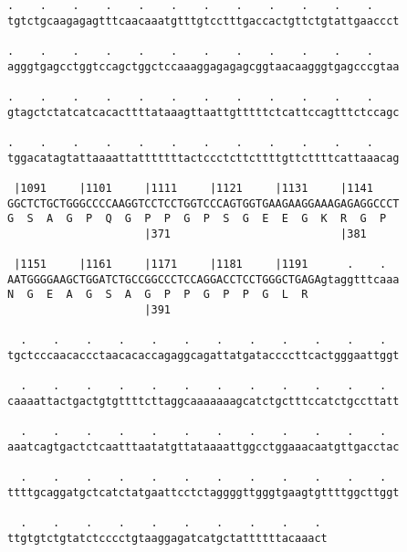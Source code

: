 \documentclass{article}
\begin{document}
\begin{Verbatim}
.    .    .    .    .    .    .    .    .    .    .    .    
tgtctgcaagagagtttcaacaaatgtttgtcctttgaccactgttctgtattgaaccct
                                                            
.    .    .    .    .    .    .    .    .    .    .    .    
agggtgagcctggtccagctggctccaaaggagagagcggtaacaagggtgagcccgtaa
                                                            
.    .    .    .    .    .    .    .    .    .    .    .    
gtagctctatcatcacacttttataaagttaattgtttttctcattccagtttctccagc
                                                            
.    .    .    .    .    .    .    .    .    .    .    .    
tggacatagtattaaaattatttttttactccctcttcttttgttcttttcattaaacag
                                                            
 |1091     |1101     |1111     |1121     |1131     |1141    
GGCTCTGCTGGGCCCCAAGGTCCTCCTGGTCCCAGTGGTGAAGAAGGAAAGAGAGGCCCT
G  S  A  G  P  Q  G  P  P  G  P  S  G  E  E  G  K  R  G  P  
                     |371                          |381     
  
 |1151     |1161     |1171     |1181     |1191      .    .  
AATGGGGAAGCTGGATCTGCCGGCCCTCCAGGACCTCCTGGGCTGAGAgtaggtttcaaa
N  G  E  A  G  S  A  G  P  P  G  P  P  G  L  R              
                     |391                                   
  
  .    .    .    .    .    .    .    .    .    .    .    .  
tgctcccaacaccctaacacaccagaggcagattatgataccccttcactgggaattggt
                                                            
  .    .    .    .    .    .    .    .    .    .    .    .  
caaaattactgactgtgttttcttaggcaaaaaaagcatctgctttccatctgccttatt
                                                            
  .    .    .    .    .    .    .    .    .    .    .    .  
aaatcagtgactctcaatttaatatgttataaaattggcctggaaacaatgttgacctac
                                                            
  .    .    .    .    .    .    .    .    .    .    .    .  
ttttgcaggatgctcatctatgaattcctctaggggttgggtgaagtgttttggcttggt
                                                            
  .    .    .    .    .    .    .    .    .    . 
ttgtgtctgtatctcccctgtaaggagatcatgctattttttacaaact
                                                 
                                                 
 

\end{Verbatim}
\end{document}
